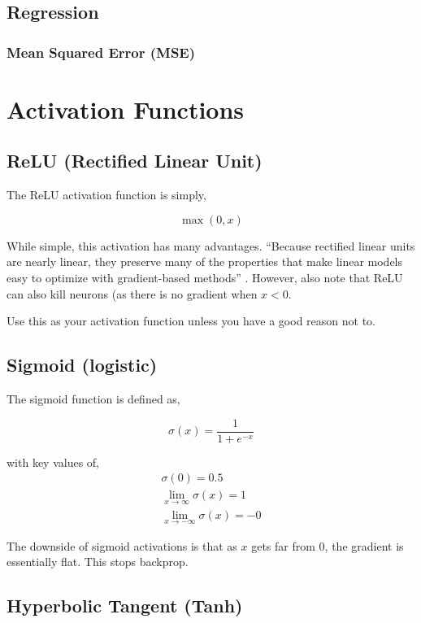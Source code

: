 \documentclass{article}
\begin{document}
\subsection{Regression}

\subsubsection{Mean Squared Error (MSE)}
\section{Activation Functions}

\subsection{ReLU (Rectified Linear Unit)}

The ReLU activation function is simply,

\begin{equation}
    \max(0, x)
\end{equation}

\noindent
While simple, this activation has many advantages. ``Because rectified linear units are nearly linear, they preserve many of the properties that make linear models easy to optimize with gradient-based methods'' \citet[pg.~169]{Goodfellow2016}.
However, also note that ReLU can also kill neurons (as there is no gradient when $x < 0$.

Use this as your activation function unless you have a good reason not to.

\subsection{Sigmoid (logistic)}

The sigmoid function is defined as,

$$
\sigma(x) = \frac{1}{1 + e^{-x}}
$$

\noindent
with key values of,
\begin{align}
    \sigma(0) = 0.5 \\
    \lim_{x \to \infty} \sigma(x) = 1 \\
    \lim_{x \to -\infty} \sigma(x) = -0
\end{align}

\noindent
The downside of sigmoid activations is that as $x$ gets far from $0$, the gradient is essentially flat. This stops backprop.

\subsection{Hyperbolic Tangent (Tanh)}
\end{document}
